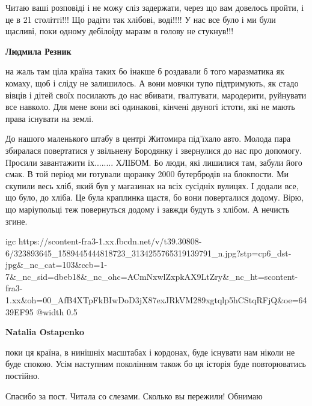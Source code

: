 
Читаю ваші розповіді і не можу сліз задержати, через що вам довелось пройти, і
це в 21 столітті!!! Що радіти так хлібові, воді!!!! У нас все було і ми були
щасливі, поки одному дебілоїду маразм в голову не стукнув!!!

\begin{itemize} %
\textbf{Людмила Резник} 

на жаль там ціла країна таких бо інакше б роздавали б того маразматика як
комаху, щоб і сліду не залишилось. А вони мовчки тупо підтримують, як стадо
вівців і дітей своїх посилають до нас вбивати, гвалтувати, мародерити,
руйнувати все навколо. Для мене вони всі одинакові, кінчені двуногі істоти, які
не мають права існувати на землі.

\end{itemize} %


До нашого маленького штабу в центрі Житомира під'їхало авто. Молода пара
збиралася повертатися у звільнену Бородянку і звернулися до нас про допомогу.
Просили завантажити їх........ ХЛІБОМ. Бо люди, які лишилися там, забули його
смак. В той період ми готували щоранку 2000 бутербродів на блокпости. Ми
скупили весь хліб, який був у магазинах на всіх сусідніх вулицях. І додали все,
що було, до хліба. Це була краплинка щастя, бо вони поверталися додому. Вірю,
що маріупольці теж повернуться додому і завжди будуть з хлібом. А нечисть
згине.

\ifcmt
  igc https://scontent-fra3-1.xx.fbcdn.net/v/t39.30808-6/323893645_1589445444818723_3134255765319139791_n.jpg?stp=cp6_dst-jpg&_nc_cat=103&ccb=1-7&_nc_sid=dbeb18&_nc_ohc=ACmNxwlZxpkAX9LtZry&_nc_ht=scontent-fra3-1.xx&oh=00_AfB4XTpFkBIwDoD3jX87exJRkVM289xgtqlp5hCStqRFjQ&oe=6439EF95
	@width 0.5
\fi

\begin{itemize} %
\textbf{Natalia Ostapenko} 

поки ця країна, в нинішніх масштабах і кордонах, буде існувати нам ніколи не
буде спокою. Усім наступним поколінням також бо ця історія буде повторюватись
постійно.

\end{itemize} %


Спасибо за пост. Читала со слезами. Сколько вы пережили! Обнимаю


